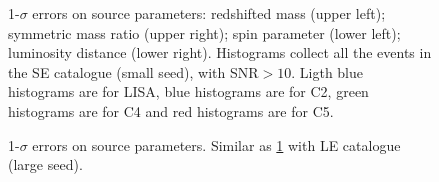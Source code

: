 \documentclass{iopart}
\begin{document}
\begin{figure}
\caption{1-$\sigma$ errors on source parameters: redshifted mass (upper left); symmetric mass ratio (upper right); spin parameter (lower left); luminosity distance (lower right). Histograms collect all the events in the SE catalogue (small seed), with SNR$>10$. Ligth blue histograms are for LISA, blue histograms are for C2, green histograms are for C4 and red histograms are for C5.
\label{Hist_SE_LISAC2C4C5} } 
\end{figure}

\begin{figure}
\caption{1-$\sigma$ errors on source parameters. Similar as \ref{Hist_SE_LISAC2C4C5} with LE catalogue (large seed).
\label{Hist_LE_LISAC2C4C5} } 
\end{figure}
\end{document}
